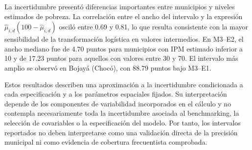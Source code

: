 \begin{table}[!htbp]
\centering
\footnotesize
\caption{Incertidumbre aproximada de las estimaciones municipales de M2 y M3 mediante el método delta ($n=1{,}121$). EE: error estándar en puntos porcentuales del IPM; P90: percentil 90; CV: coeficiente de variación; IC95: intervalo aproximado del 95\,\% construido en escala logit.}
\label{tab:incertidumbre}
\renewcommand{\arraystretch}{1.1}
\setlength{\tabcolsep}{5pt}
\end{table}

La incertidumbre presentó diferencias importantes entre municipios y niveles estimados de pobreza. La correlación entre el ancho del intervalo y la expresión $\hat{\mu}_{i,d}(100-\hat{\mu}_{i,d})$ osciló entre 0.69 y 0.81, lo que resulta consistente con la mayor sensibilidad de la transformación logística en valores intermedios. En M3--E2, el ancho mediano fue de 4.70 puntos para municipios con IPM estimado inferior a 10 y de 17.23 puntos para aquellos con valores entre 30 y 70. El intervalo más amplio se observó en Bojayá (Chocó), con 88.79 puntos bajo M3--E1.

Estos resultados describen una aproximación a la incertidumbre condicionada a cada especificación y a los parámetros espaciales fijados. Su interpretación depende de los componentes de variabilidad incorporados en el cálculo y no contempla necesariamente toda la incertidumbre asociada al benchmarking, la selección de covariables o la especificación del modelo. Por tanto, los intervalos reportados no deben interpretarse como una validación directa de la precisión municipal ni como evidencia de cobertura frecuentista comprobada.


